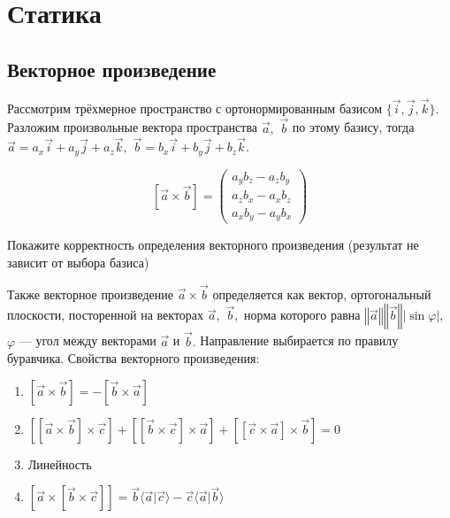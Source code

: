 \chapter{Статика}
\section{Векторное произведение}
Рассмотрим трёхмерное пространство с ортонормированным базисом $\{\vec{i}, \vec{j}, \vec{k}\}.$
Разложим произвольные вектора пространства $\vec{a},$ $\vec{b}$ по этому базису, тогда
$\vec{a} = a_x \vec{i} + a_y \vec{j} + a_z \vec{k},$
$\vec{b} = b_x \vec{i} + b_y \vec{j} + b_z \vec{k}.$
\begin{definition}
$$[\vec{a} \times \vec{b}] = \begin{pmatrix}
	a_y b_z - a_z b_y \\
	a_z b_x - a_x b_z \\
	a_x b_y - a_y b_x \end{pmatrix}
$$\end{definition}
\begin{task}
Покажите корректность определения векторного произведения
(результат не зависит от выбора базиса)\end{task}
Также векторное произведение $\vec{a} \times \vec{b}$ определяется
как вектор, ортогональный плоскости, посторенной на векторах $\vec{a},$
$\vec{b},$ норма которого равна $\left\Vert \vec{a} \right \Vert 
\left \Vert \vec{b} \right \Vert \left \vert \sin \varphi \right \vert,$
$\varphi$ --- угол между векторами $\vec{a}$ и $\vec{b}.$ Направление
выбирается по правилу буравчика.
Свойства векторного произведения:
\begin{enumerate}
\item $[\vec{a} \times \vec{b}] = - [\vec{b} \times \vec{a}]$
\item $[[\vec{a} \times \vec{b}] \times \vec{c} ] + [[\vec{b} \times \vec{c}] \times \vec{a}]
+ [[\vec{c} \times \vec{a}]\times\vec{b}] = 0$
\item Линейность
\item $[\vec{a} \times [\vec{b} \times \vec{c}]] = 
\vec{b} \langle \vec{a} \vert \vec{c}\rangle-
\vec{c} \langle \vec{a} \vert \vec{b}\rangle$
\end{enumerate}
